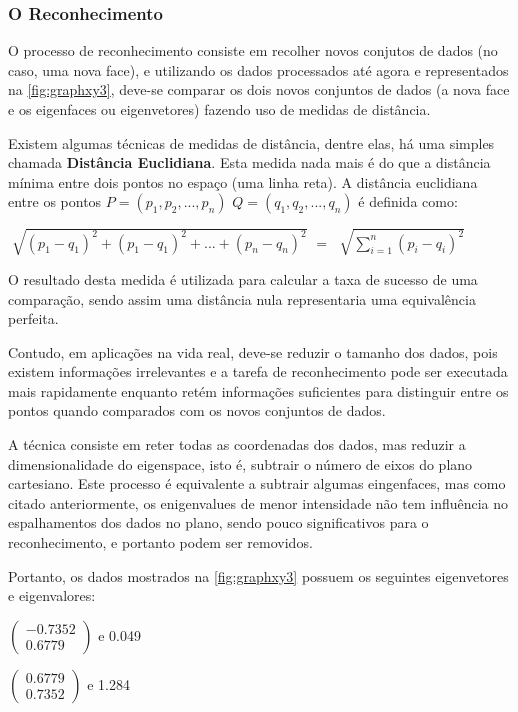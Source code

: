 \subsubsection{O Reconhecimento}\label{subsec:eigenacp}

O processo de reconhecimento consiste em recolher novos conjutos de dados (no caso, uma nova face), e utilizando os dados processados até agora e representados na \autoref{fig:graphxy3}, deve-se comparar os dois novos conjuntos de dados (a nova face e os eigenfaces ou eigenvetores) fazendo uso de medidas de distância. 

Existem algumas técnicas de medidas de distância, dentre elas, há uma simples chamada \textbf{Distância Euclidiana}. Esta medida nada mais é do que a distância mínima entre dois pontos no espaço (uma linha reta). A distância euclidiana entre os pontos $P = (p_1, p_2, ..., p_n)$ $Q = (q_1, q_2, ..., q_n)$ é definida como:

\begin{center}
	$\sqrt[]{(p_1 - q_1)^2 + (p_1 - q_1)^2 + ... + (p_n - q_n)^2}$ $=$ $\sqrt[]{ \sum_{i=1}^{n} (p_i - q_i)^2 }$ 
\end{center}

O resultado desta medida é utilizada para calcular a taxa de sucesso de uma comparação, sendo assim uma distância nula representaria uma equivalência perfeita.

Contudo, em aplicações na vida real, deve-se reduzir o tamanho dos dados, pois existem informações irrelevantes e a tarefa de reconhecimento pode ser executada mais rapidamente enquanto retém informações suficientes para distinguir entre os pontos quando comparados com os novos conjuntos de dados.

A técnica consiste em reter todas as coordenadas dos dados, mas reduzir a dimensionalidade do eigenspace, isto é, subtrair o número de eixos do plano cartesiano. Este processo é equivalente a subtrair algumas eingenfaces, mas como citado anteriormente, os enigenvalues de menor intensidade não tem influência no espalhamentos dos dados no plano, sendo pouco significativos para o reconhecimento, e portanto podem ser removidos.

Portanto, os dados mostrados na  \autoref{fig:graphxy3} possuem os seguintes eigenvetores e eigenvalores:

\begin{center}
	$\begin{pmatrix} -0.7352 \\ 0.6779 \end{pmatrix}$  e 0.049
	
	$\begin{pmatrix} 0.6779 \\ 0.7352 \end{pmatrix}$  e 1.284
\end{center}

